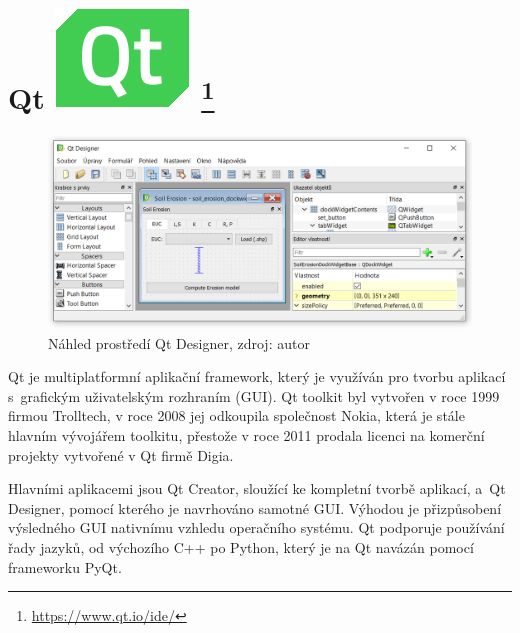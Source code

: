 \section[Qt]{Qt \includegraphics[scale=0.20]{./pictures/qt.png} 
\footnote{\url{https://www.qt.io/ide/}}}
\label{qt}
\begin{figure}[H]
    \centering \includegraphics[scale=0.6]{./pictures/qt_screen.png}
      \caption[Náhled prostředí Qt Designer]
      {Náhled prostředí Qt Designer, zdroj: autor}
      \label{screen:qt}
\end{figure}
Qt je multiplatformní aplikační framework, který je využíván pro
tvorbu aplikací s~grafickým uživatelským rozhraním (GUI). Qt toolkit
byl vytvořen v roce 1999 firmou Trolltech, v roce 2008 jej odkoupila
společnost Nokia, která je stále hlavním vývojářem toolkitu, přestože
v roce 2011 prodala licenci na komerční projekty vytvořené v Qt firmě
Digia.

Hlavními aplikacemi jsou Qt Creator, sloužící ke kompletní tvorbě
aplikací, a~Qt Designer, pomocí kterého je navrhováno samotné
GUI. Výhodou je přizpůsobení výsledného GUI nativnímu vzhledu
operačního systému. Qt podporuje používání řady jazyků, od výchozího
C++ po Python, který je na Qt navázán pomocí frameworku PyQt.\cite{qt}
\cite{rapidPyQt}
